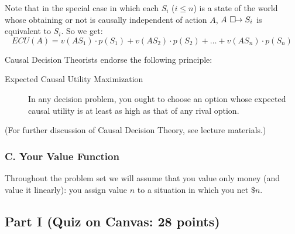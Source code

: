 \documentclass[12pt,letterpaper]{article}
\begin{document}
{Note that in the special case in which each $S_i$ ($i \leq n$) is a state of the world whose obtaining or not is causally independent of action $A$, $A \ \Box\hspace{-1.6mm}\rightarrow S_i$ is equivalent to $S_i$. So we get:
\[
ECU(A) = v(A S_1) \cdot p(S_1) +  v(A S_2) \cdot p(S_2) + \ldots +  v(A S_n) \cdot p(S_n)
\]


Causal Decision Theorists endorse the following principle:
\begin{description}
\item[Expected Causal Utility Maximization]
In any decision problem, you ought to choose an option whose expected causal utility is at least as high as that of any rival option.
\end{description}
(For further discussion of Causal Decision Theory, see lecture materials.)


\subsubsection*{C. Your Value Function} 


Throughout the problem set we will assume that you value only money (and value it linearly): you assign value \(n\) to a situation in which you net \(\$n\).
}

\subsection*{Part I (Quiz on Canvas: 28 points)} 
\end{document}
